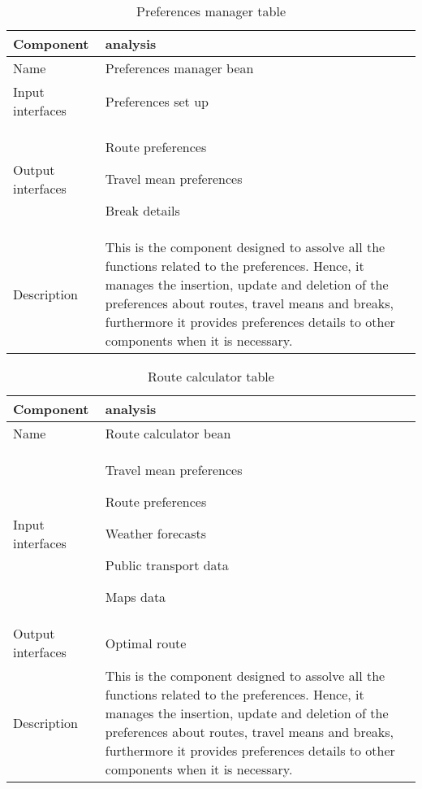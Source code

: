 \begin{flushleft}
	
	\begin{table}[htp]
		
		\begin{tabular}{l|l}
			Component&analysis\\
			\hline
			\hline
			Name&Preferences manager bean\\
			\hline
			Input interfaces& Preferences set up \\
			\hline
			Output interfaces& \item Route preferences \item Travel mean preferences \item Break details\\
			\hline
			Description&This is the component designed to assolve all the functions related to the preferences. Hence, it manages the insertion, update and deletion of the preferences about routes, travel means and breaks, furthermore it provides preferences details to other components when it is necessary. \\
			\hline
			
		\end{tabular}
		
		\caption{Preferences manager table } 
		\label{tab:preferencesmanagertable}
		
	\end{table}
	
\end{flushleft}

\begin{flushleft}
	
	\begin{table}[htp]
		
		\begin{tabular}{l|l}
			Component&analysis\\
			\hline
			\hline
			Name&Route calculator bean\\
			\hline
			Input interfaces& \item Travel mean preferences \item Route preferences \item Weather forecasts \item Public transport data \item Maps data \\
			\hline
			Output interfaces& Optimal route\\
			\hline
			Description&This is the component designed to assolve all the functions related to the preferences. Hence, it manages the insertion, update and deletion of the preferences about routes, travel means and breaks, furthermore it provides preferences details to other components when it is necessary. \\
			\hline
			
		\end{tabular}
		
		\caption{Route calculator table } 
		\label{tab:routecalculatortable}
		
	\end{table}
	
\end{flushleft}

